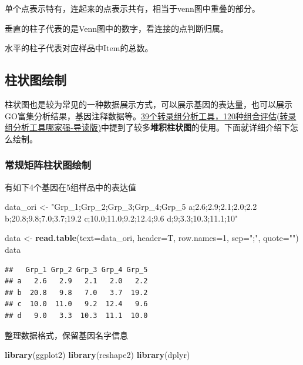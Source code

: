 \documentclass[]{article}
\newenvironment{Shaded}{\begin{snugshade}}{\end{snugshade}}
\newcommand{\KeywordTok}[1]{\textcolor[rgb]{0.13,0.29,0.53}{\textbf{{#1}}}}
\newcommand{\DataTypeTok}[1]{\textcolor[rgb]{0.13,0.29,0.53}{{#1}}}
\newcommand{\DecValTok}[1]{\textcolor[rgb]{0.00,0.00,0.81}{{#1}}}
\newcommand{\StringTok}[1]{\textcolor[rgb]{0.31,0.60,0.02}{{#1}}}
\newcommand{\NormalTok}[1]{{#1}}
\numberwithin{figure}{section}
\numberwithin{table}{section}
\theoremstyle{definition}
\theoremstyle{definition}
\theoremstyle{definition}
\theoremstyle{remark}
\begin{document}
单个点表示特有，连起来的点表示共有，相当于venn图中重叠的部分。

垂直的柱子代表的是Venn图中的数字，看连接的点判断归属。

水平的柱子代表对应样品中Item的总数。

\subsection{柱状图绘制}

柱状图也是较为常见的一种数据展示方式，可以展示基因的表达量，也可以展示GO富集分析结果，基因注释数据等。\href{http://mp.weixin.qq.com/s?__biz=MzI5MTcwNjA4NQ==\&mid=2247484106\&idx=1\&sn=687a0def51f6ea91a335754eb3dc9ca9\&chksm=ec0dc740db7a4e564e5b1e93a36e5d9447581e262eec9c2983d1d4e76788d673c9c07dec8f8e\#rd}{39个转录组分析工具，120种组合评估(转录组分析工具哪家强-导读版)}中提到了较多\textbf{堆积柱状图}的使用。下面就详细介绍下怎么绘制。

\subsubsection{常规矩阵柱状图绘制}

有如下4个基因在5组样品中的表达值

\begin{Shaded}
\begin{Highlighting}[]
\NormalTok{data_ori <-}\StringTok{ "Grp_1;Grp_2;Grp_3;Grp_4;Grp_5}
\StringTok{a;2.6;2.9;2.1;2.0;2.2}
\StringTok{b;20.8;9.8;7.0;3.7;19.2}
\StringTok{c;10.0;11.0;9.2;12.4;9.6}
\StringTok{d;9;3.3;10.3;11.1;10"}

\NormalTok{data <-}\StringTok{ }\KeywordTok{read.table}\NormalTok{(}\DataTypeTok{text=}\NormalTok{data_ori, }\DataTypeTok{header=}\NormalTok{T, }\DataTypeTok{row.names=}\DecValTok{1}\NormalTok{, }\DataTypeTok{sep=}\StringTok{";"}\NormalTok{, }\DataTypeTok{quote=}\StringTok{""}\NormalTok{)}
\NormalTok{data}
\end{Highlighting}
\end{Shaded}

\begin{verbatim}
##   Grp_1 Grp_2 Grp_3 Grp_4 Grp_5
## a   2.6   2.9   2.1   2.0   2.2
## b  20.8   9.8   7.0   3.7  19.2
## c  10.0  11.0   9.2  12.4   9.6
## d   9.0   3.3  10.3  11.1  10.0
\end{verbatim}

整理数据格式，保留基因名字信息

\begin{Shaded}
\begin{Highlighting}[]
\KeywordTok{library}\NormalTok{(ggplot2)}
\KeywordTok{library}\NormalTok{(reshape2)}
\KeywordTok{library}\NormalTok{(dplyr)}
\end{Highlighting}
\end{Shaded}
\end{document}

